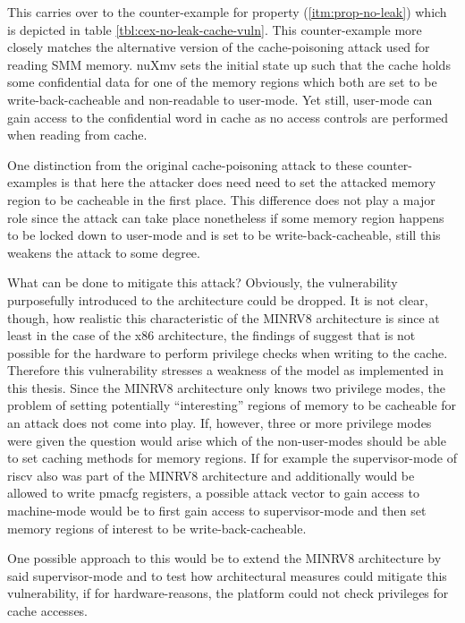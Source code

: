 This carries over to the counter-example for property  (\ref{itm:prop-no-leak}) which is depicted in table \ref{tbl:cex-no-leak-cache-vuln}.
This counter-example more closely matches the alternative version of the cache-poisoning attack used for reading SMM memory.
nuXmv sets the initial state up such that the cache holds some confidential data for one of the memory regions which both are set to be write-back-cacheable and non-readable to user-mode.
Yet still, user-mode can gain access to the confidential word in cache as no access controls are performed when reading from cache.

One distinction from the original cache-poisoning attack to these counter-examples is that here the attacker does need need to set the attacked memory region to be cacheable in the first place.
This difference does not play a major role since the attack can take place nonetheless if some memory region happens to be locked down to user-mode and is set to be write-back-cacheable, still this weakens the attack to some degree.

What can be done to mitigate this attack?
Obviously, the vulnerability purposefully introduced to the architecture could be dropped.
It is not clear, though, how realistic this characteristic of the MINRV8 architecture is since at least in the case of the x86 architecture, the findings of \cite{Wojtczuk09} suggest that is not possible for the hardware to perform privilege checks when writing to the cache.
Therefore this vulnerability stresses a weakness of the model as implemented in this thesis.
Since the MINRV8 architecture only knows two privilege modes, the problem of setting potentially \enquote{interesting} regions of memory to be cacheable for an attack does not come into play.
If, however, three or more privilege modes were given the question would arise which of the non-user-modes should be able to set caching methods for memory regions.
If for example the supervisor-mode of \gls{riscv} also was part of the MINRV8 architecture and additionally would be allowed to write \gls{pmacfg} registers, a possible attack vector to gain access to machine-mode would be to first gain access to supervisor-mode and then set memory regions of interest to be write-back-cacheable.

One possible approach to this would be to extend the MINRV8 architecture by said supervisor-mode and to test how architectural measures could mitigate this vulnerability, if for hardware-reasons, the platform could not check privileges for cache accesses.

